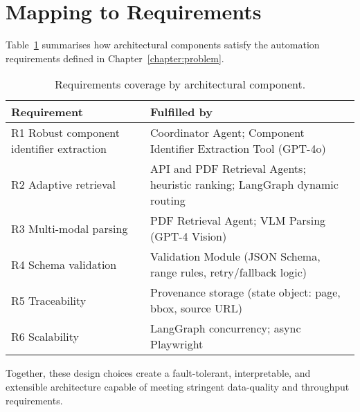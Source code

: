 \section{Mapping to Requirements}
Table~\ref{tab:reqmap} summarises how architectural components satisfy the automation requirements defined in Chapter~\ref{chapter:problem}.

\begin{table}[ht]
  \centering
  \caption{Requirements coverage by architectural component.}
  \label{tab:reqmap}
  \begin{tabular}{p{3.7cm} p{8.8cm}}
    \hline
    \textbf{Requirement} & \textbf{Fulfilled by} \\\hline
    R1 Robust component identifier extraction & Coordinator Agent; Component Identifier Extraction Tool (GPT-4o) \\
    R2 Adaptive retrieval & API and PDF Retrieval Agents; heuristic ranking; LangGraph dynamic routing \\
    R3 Multi-modal parsing & PDF Retrieval Agent; VLM Parsing (GPT-4 Vision) \\
    R4 Schema validation & Validation Module (JSON Schema, range rules, retry/fallback logic) \\
    R5 Traceability & Provenance storage (state object: page, bbox, source URL) \\
    R6 Scalability & LangGraph concurrency; async Playwright \\
    \hline
  \end{tabular}
\end{table}

Together, these design choices create a fault-tolerant, interpretable, and extensible architecture capable of meeting stringent data-quality and throughput requirements.
